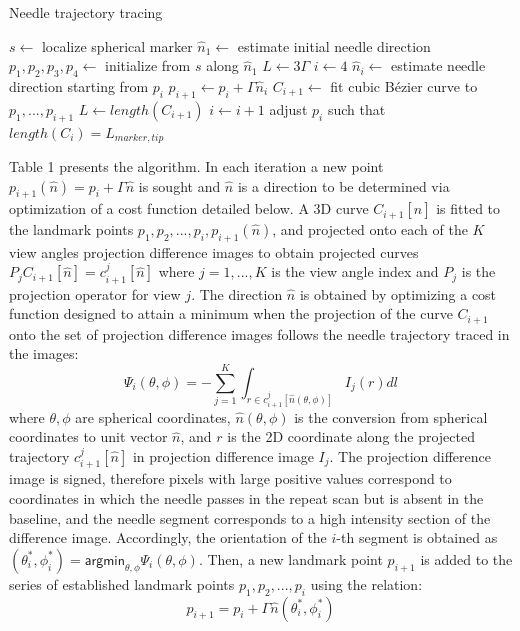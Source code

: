 \begin{algorithm}
\caption{Needle trajectory tracing}
\begin{algorithmic}
  \STATE $s\leftarrow$ localize spherical marker
  \STATE $\hat{n}_1 \leftarrow$ estimate initial needle direction
  \STATE $p_1, p_2, p_3, p_4 \leftarrow$ initialize from $s$ along $\hat{n}_1$
  \STATE $L\leftarrow 3\Gamma$ 
  \STATE $i\leftarrow 4$
    \STATE $\hat{n}_{i} \leftarrow$ estimate needle direction starting from $p_i$
    \STATE $p_{i+1} \leftarrow p_i + \Gamma \hat{n}_{i}$
    \STATE $C_{i+1}\leftarrow$ fit cubic B\'ezier curve to $p_1, ..., p_{i+1}$
    \STATE $L\leftarrow length(C_{i+1})$ 
    \STATE $i\leftarrow i+1$
  \ENDWHILE
  \STATE adjust $p_i$ such that $length(C_i) = L_{marker,tip}$
\end{algorithmic}
\end{algorithm}

Table 1 presents the algorithm. 
In each iteration a new point $p_{i+1}(\hat{n}) = p_i + \Gamma \hat{n}$ is sought and $\hat{n}$ is a direction to be determined via optimization of a cost function detailed below.
A 3D curve $C_{i+1}[\hat{n}]$ is fitted to the landmark points $p_1, p_2, ..., p_i, p_{i+1}(\hat{n})$, and projected onto each of the $K$ view angles projection difference images to obtain projected curves $P_j C_{i+1}[\hat{n}] = c_{i+1}^j[\hat{n}]$ where $j=1,...,K$ is the view angle index and $P_j$ is the projection operator for view $j$.
The direction $\hat{n}$ is obtained by optimizing a cost function designed to attain a minimum when the projection of the curve $C_{i+1}$ onto the set of projection difference images follows the needle trajectory traced in the images:
\[ \Psi_i(\theta, \phi) = -\sum_{j=1}^K{\int_{r \in c_{i+1}^j[\hat{n}(\theta, \phi)]} {I_j(r)dl}} \]
where $ \theta, \phi$ are spherical coordinates, $ \hat{n}(\theta, \phi) $ is the conversion from spherical coordinates to unit vector $ \hat{n} $, and $r$ is the 2D coordinate along the projected trajectory $c_{i+1}^j[\hat{n}]$ in projection difference image $I_j$. The projection difference image is signed, therefore pixels with large positive values correspond to coordinates in which the needle passes in the repeat scan but is absent in the baseline, and the needle segment corresponds to a high intensity section of the difference image.
Accordingly, the orientation of the $i$-th segment is obtained as $(\theta_i^*, \phi_i^*) = \textsf{argmin}_{\theta, \phi} \Psi_i ( \theta, \phi)$. Then, a new landmark point $p_{i+1}$ is added to the series of established landmark points $p_1, p_2, ..., p_i$ using the relation:
$$ p_{i+1} = p_i + \Gamma \hat{n}(\theta_i^*, \phi_i^*) $$

